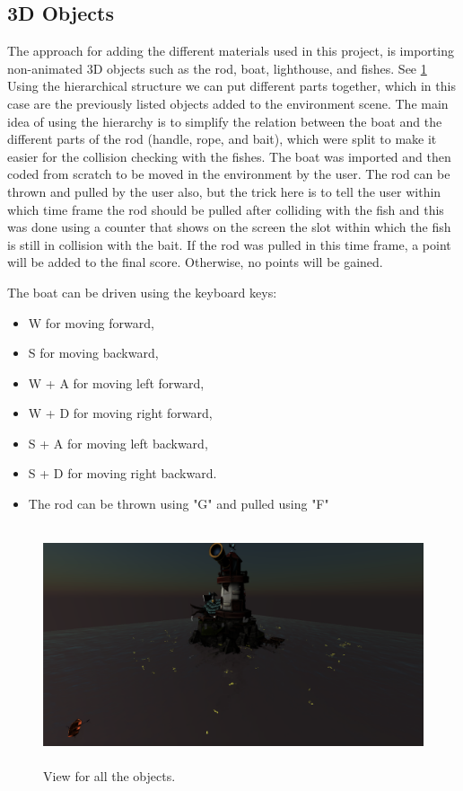 \documentclass[paper=a4, fontsize=11pt]{scrartcl} %
\numberwithin{equation}{section} %
\numberwithin{figure}{section} %
\numberwithin{table}{section} %
\begin{document}
\subsection{3D Objects}

The approach for adding the different materials used in this project, is importing non-animated 3D objects such as the rod, boat, lighthouse, and fishes. See \ref{house} 
Using the hierarchical structure we can put different parts together, which in this case are the previously listed objects added to the environment scene. The main idea of using the hierarchy is to simplify the relation between the boat and the different parts of the rod (handle, rope, and bait), which were split to make it easier for the collision checking with the fishes. The boat was imported and then coded from scratch to be moved in the environment by the user. The rod can be thrown and pulled by the user also, but the trick here is to tell the user within which time frame the rod should be pulled after colliding with the fish and this was done using a counter that shows on the screen the slot within which the fish is still in collision with the bait. If the rod was pulled in this time frame, a point will be added to the final score. Otherwise, no points will be gained.\par
The boat can be driven using the keyboard keys:
\begin{itemize}
\item W for moving forward,
\item S for moving backward,
\item W + A for moving left forward,
\item W + D for moving right forward,
\item S + A for moving left backward,
\item S + D for moving right backward.
\item The rod can be thrown using "G" and pulled using "F" 
\end{itemize}


\begin{figure}[!ht]
\centering
\includegraphics[width=15cm, height=7cm]{images/lighthouse.png}
\caption{View for all the objects.}
\label{house}
\end{figure}
\newpage
\end{document}

